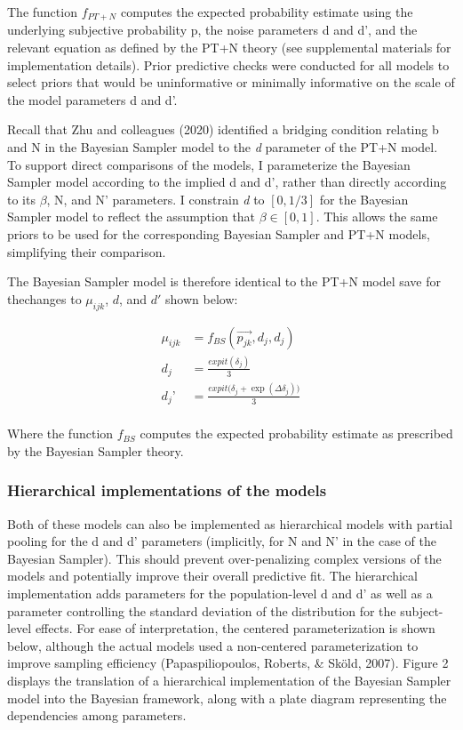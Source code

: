 \documentclass[
  english,
  man,floatsintext]{apa6}
\begin{document}
The function \(f_{PT+N}\) computes the expected probability estimate using the underlying subjective probability p, the noise parameters d and d', and the relevant equation as defined by the PT+N theory (see supplemental materials for implementation details). Prior predictive checks were conducted for all models to select priors that would be uninformative or minimally informative on the scale of the model parameters d and d'.

Recall that Zhu and colleagues (2020) identified a bridging condition relating b and N in the Bayesian Sampler model to the \emph{d} parameter of the PT+N model. To support direct comparisons of the models, I parameterize the Bayesian Sampler model according to the implied d and d', rather than directly according to its \(\beta\), N, and N' parameters. I constrain \emph{d} to \([0, 1/3]\) for the Bayesian Sampler model to reflect the assumption that \(\beta \in [0, 1]\). This allows the same priors to be used for the corresponding Bayesian Sampler and PT+N models, simplifying their comparison.

The Bayesian Sampler model is therefore identical to the PT+N model save for thechanges to \(\mu_{ijk}\), \(d\), and \(d'\) shown below:

\begin{align*}
  \mu_{ijk} &= f_{BS}(\overrightarrow{p_{jk}}, d_j, d_j)  \\
  d_j &= \frac{expit(\delta_j)}{3} \\
  d_j’ &= \frac{expit\big(\delta_j + \exp(\Delta\delta_j)\big)}{3} \\
\end{align*}

Where the function \(f_{BS}\) computes the expected probability estimate as prescribed by the Bayesian Sampler theory.

\hypertarget{hierarchical-implementations-of-the-models}{%
\subsubsection{Hierarchical implementations of the models}\label{hierarchical-implementations-of-the-models}}

Both of these models can also be implemented as hierarchical models with partial pooling for the d and d' parameters (implicitly, for N and N' in the case of the Bayesian Sampler). This should prevent over-penalizing complex versions of the models and potentially improve their overall predictive fit. The hierarchical implementation adds parameters for the population-level d and d' as well as a parameter controlling the standard deviation of the distribution for the subject-level effects. For ease of interpretation, the centered parameterization is shown below, although the actual models used a non-centered parameterization to improve sampling efficiency (Papaspiliopoulos, Roberts, \& Sköld, 2007). Figure 2 displays the translation of a hierarchical implementation of the Bayesian Sampler model into the Bayesian framework, along with a plate diagram representing the dependencies among parameters.
\end{document}
